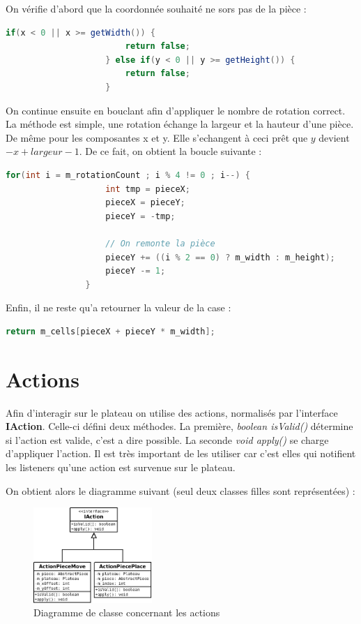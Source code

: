 \documentclass[report]{BetterDocument}
\begin{document}
			On vérifie d'abord que la coordonnée souhaité ne sors pas de la pièce :

			\begin{lstlisting}[gobble=16, language=Java, caption=Vérification pré rotation]
					if(x < 0 || x >= getWidth()) {
						return false;
					} else if(y < 0 || y >= getHeight()) {
						return false;
					}
			\end{lstlisting}

			On continue ensuite en bouclant afin d'appliquer le nombre de rotation correct. La méthode est simple, une rotation échange la largeur et la hauteur d'une pièce. De même pour les composantes x et y. Elle s'echangent à ceci prêt que $y$ devient $-x + largeur - 1$. De ce fait, on obtient la boucle suivante :

			\begin{lstlisting}[gobble=16, language=Java, caption=Inversement du nombre de rotation]
				for(int i = m_rotationCount ; i % 4 != 0 ; i--) {
					int tmp = pieceX;
					pieceX = pieceY;
					pieceY = -tmp;

					// On remonte la pièce
					pieceY += ((i % 2 == 0) ? m_width : m_height);
					pieceY -= 1;
				}
			\end{lstlisting}

			Enfin, il ne reste qu'a retourner la valeur de la case :

			\begin{lstlisting}[gobble=16, language=Java, caption=Retourne la valeur de la case]
				return m_cells[pieceX + pieceY * m_width];
			\end{lstlisting}

	\section{Actions}

		Afin d'interagir sur le plateau on utilise des actions, normalisés par l'interface \textbf{IAction}. Celle-ci défini deux méthodes. La première, \textit{boolean isValid()} détermine si l'action est valide, c'est a dire possible. La seconde \textit{void apply()} se charge d'appliquer l'action. Il est très important de les utiliser car c'est elles qui notifient les listeners qu'une action est survenue sur le plateau.

		On obtient alors le diagramme suivant (seul deux classes filles sont représentées) :

		\begin{figure}[H]
			\centering\includegraphics[width=0.4\textwidth, keepaspectratio]{img/action.png}
			\caption{Diagramme de classe concernant les actions}
		\end{figure}
\end{document}
